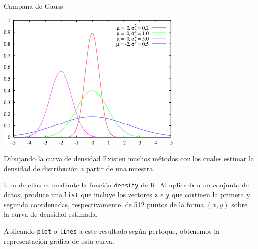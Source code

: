 \documentclass[
  ignorenonframetext,
  aspectratio=169]{beamer}
\begin{document}
\begin{frame}{Campana de Gauss}
\label{campana-de-gauss-1}
\begin{center}\includegraphics[width=0.5\linewidth]{Imgs/gauss} \end{center}
\end{frame}

\begin{frame}[fragile]{Dibujando la curva de densidad}
\label{dibujando-la-curva-de-densidad}
Existen muchos métodos con los cuales estimar la densidad de
distribución a partir de una muestra.

Una de ellas es mediante la función \texttt{density} de R. Al aplicarla
a un conjunto de datos, produce una \texttt{list} que incluye los
vectores \texttt{x} e \texttt{y} que continen la primera y segunda
coordenadas, respectivamente, de 512 puntos de la forma \((x,y)\) sobre
la curva de densidad estimada.

Aplicando \texttt{plot} o \texttt{lines} a este resultado según
pertoque, obtenemos la representación gráfica de esta curva.
\end{frame}
\end{document}
